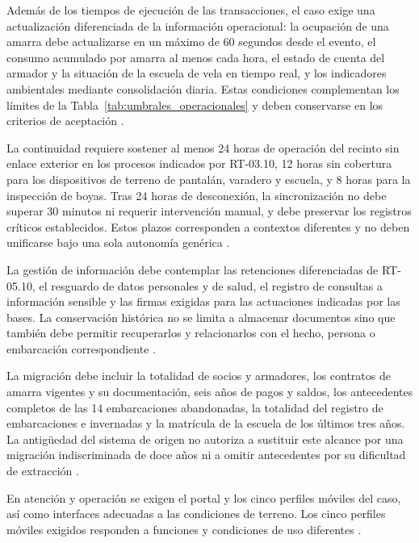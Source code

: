 Además de los tiempos de ejecución de las transacciones, el caso exige una actualización diferenciada de la información operacional: la ocupación de una amarra debe actualizarse en un máximo de 60 segundos desde el evento, el consumo acumulado por amarra al menos cada hora, el estado de cuenta del armador y la situación de la escuela de vela en tiempo real, y los indicadores ambientales mediante consolidación diaria. Estas condiciones complementan los límites de la Tabla~\ref{tab:umbrales_operacionales} y deben conservarse en los criterios de aceptación \parencite[cap.~15, RT-05.29, p.~34]{pucv-caso07-2026}.

La continuidad requiere sostener al menos 24 horas de operación del recinto sin enlace exterior en los procesos indicados por RT-03.10, 12 horas sin cobertura para los dispositivos de terreno de pantalán, varadero y escuela, y 8 horas para la inspección de boyas. Tras 24 horas de desconexión, la sincronización no debe superar 30 minutos ni requerir intervención manual, y debe preservar los registros críticos establecidos. Estos plazos corresponden a contextos diferentes y no deben unificarse bajo una sola autonomía genérica \parencite[cap.~15, RT-03.10 y RT-03.13, p.~33]{pucv-caso07-2026}.

La gestión de información debe contemplar las retenciones diferenciadas de RT-05.10, el resguardo de datos personales y de salud, el registro de consultas a información sensible y las firmas exigidas para las actuaciones indicadas por las bases. La conservación histórica no se limita a almacenar documentos sino que también debe  permitir recuperarlos y relacionarlos con el hecho, persona o embarcación correspondiente \parencite[cap.~15, RT-05.10, RT-11.10, RT-16.09 y RT-16.14, pp.~33-35]{pucv-caso07-2026}.

La migración debe incluir la totalidad de socios y armadores, los contratos de amarra vigentes y su documentación, seis años de pagos y saldos, los antecedentes completos de las 14 embarcaciones abandonadas, la totalidad del registro de embarcaciones e invernadas y la matrícula de la escuela de los últimos tres años. La antigüedad del sistema de origen no autoriza a sustituir este alcance por una migración indiscriminada de doce años ni a omitir antecedentes por su dificultad de extracción \parencite[cap.~15, RT-05.15, p.~34]{pucv-caso07-2026}.

En atención y operación se exigen el portal y los cinco perfiles móviles del caso, así como interfaces adecuadas a las condiciones de terreno. Los cinco perfiles móviles exigidos responden a funciones y condiciones de uso diferentes \parencite[cap.~10, p.~26; cap.~15, RT-13.08, p.~35 y RT-17.01, p.~36]{pucv-caso07-2026}.
%

